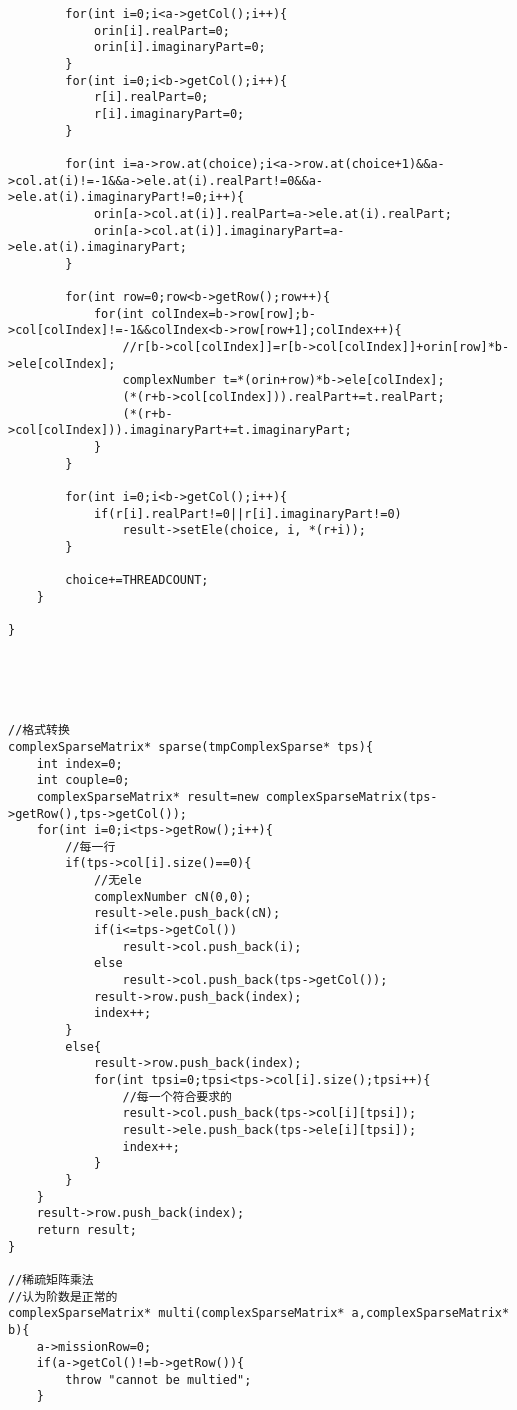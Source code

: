 \begin{lstlisting}
        for(int i=0;i<a->getCol();i++){
            orin[i].realPart=0;
            orin[i].imaginaryPart=0;
        }
        for(int i=0;i<b->getCol();i++){
            r[i].realPart=0;
            r[i].imaginaryPart=0;
        }
        
        for(int i=a->row.at(choice);i<a->row.at(choice+1)&&a->col.at(i)!=-1&&a->ele.at(i).realPart!=0&&a->ele.at(i).imaginaryPart!=0;i++){
            orin[a->col.at(i)].realPart=a->ele.at(i).realPart;
            orin[a->col.at(i)].imaginaryPart=a->ele.at(i).imaginaryPart;
        }
        
        for(int row=0;row<b->getRow();row++){
            for(int colIndex=b->row[row];b->col[colIndex]!=-1&&colIndex<b->row[row+1];colIndex++){
                //r[b->col[colIndex]]=r[b->col[colIndex]]+orin[row]*b->ele[colIndex];
                complexNumber t=*(orin+row)*b->ele[colIndex];
                (*(r+b->col[colIndex])).realPart+=t.realPart;
                (*(r+b->col[colIndex])).imaginaryPart+=t.imaginaryPart;
            }
        }
        
        for(int i=0;i<b->getCol();i++){
            if(r[i].realPart!=0||r[i].imaginaryPart!=0)
                result->setEle(choice, i, *(r+i));
        }
        
        choice+=THREADCOUNT;
    }
    
}





//格式转换
complexSparseMatrix* sparse(tmpComplexSparse* tps){
    int index=0;
    int couple=0;
    complexSparseMatrix* result=new complexSparseMatrix(tps->getRow(),tps->getCol());
    for(int i=0;i<tps->getRow();i++){
        //每一行
        if(tps->col[i].size()==0){
            //无ele
            complexNumber cN(0,0);
            result->ele.push_back(cN);
            if(i<=tps->getCol())
                result->col.push_back(i);
            else
                result->col.push_back(tps->getCol());
            result->row.push_back(index);
            index++;
        }
        else{
            result->row.push_back(index);
            for(int tpsi=0;tpsi<tps->col[i].size();tpsi++){
                //每一个符合要求的
                result->col.push_back(tps->col[i][tpsi]);
                result->ele.push_back(tps->ele[i][tpsi]);
                index++;
            }
        }
    }
    result->row.push_back(index);
    return result;
}

//稀疏矩阵乘法
//认为阶数是正常的
complexSparseMatrix* multi(complexSparseMatrix* a,complexSparseMatrix* b){
    a->missionRow=0;
    if(a->getCol()!=b->getRow()){
        throw "cannot be multied";
    }
    

\end{lstlisting}
